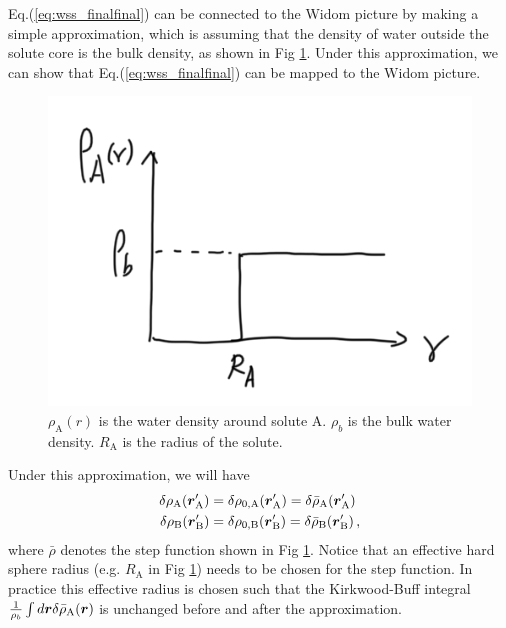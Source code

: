 \documentclass[9pt]{article}
\renewcommand{\vec}[1]{\mbox{\boldmath$#1$}}
\newcommand{\A}{\mathrm{A}}
\newcommand{\B}{\mathrm{B}}
\begin{document}
Eq.(\ref{eq:wss_finalfinal}) can be connected to the Widom picture by making a simple approximation, which is assuming that the density of water outside the solute core is the bulk density, as shown in Fig \ref{fig:density}.
Under this approximation, we can show that  Eq.(\ref{eq:wss_finalfinal}) can be mapped to the Widom picture.
\begin{figure}[htp]
\centering
\includegraphics[scale=0.4]{Fig_density.png}
\caption{$\rho_{\A}(r)$ is the water density around solute A. $\rho_b$ is the bulk water density. $R_{\A}$ is the radius of the solute.}
\label{fig:density}
\end{figure}

Under this approximation, we will have 
\begin{align}
\begin{split}
\delta \rho_{\A}(\vec{r}_{\A}') & = \delta \rho_{0, \A}(\vec{r}_{\A}')  = \delta \bar{\rho}_{\A} (\vec{r}_{\A}') \\
\delta \rho_{\B}(\vec{r}_{\B}') & = \delta \rho_{0, \B}(\vec{r}_{\B}')  =  \delta \bar{\rho}_{\B} (\vec{r}_{\B}')  \,,
\end{split}
\label{eq:approx}
\end{align}
where $\bar{\rho}$ denotes the step function shown in Fig \ref{fig:density}. Notice that  an effective hard sphere radius (e.g. $R_{\A}$ in Fig  \ref{fig:density}) needs to be chosen for the step function. In practice this effective radius is chosen such that the Kirkwood-Buff integral $\frac{1}{\rho_b}\int d\vec{r} \delta \bar{\rho}_{\A} (\vec{r}) $ is unchanged before and after the approximation.
\end{document}
